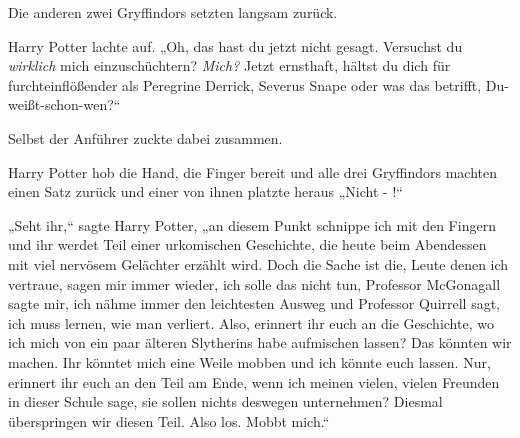 Die anderen zwei Gryffindors setzten langsam zurück.

Harry Potter lachte auf. „Oh, das hast du jetzt nicht gesagt. Versuchst du \emph{wirklich} mich einzuschüchtern? \emph{Mich?} Jetzt ernsthaft, hältst du dich für furchteinflößender als Peregrine Derrick, Severus Snape oder was das betrifft, Du-weißt-schon-wen?“

Selbst der Anführer zuckte dabei zusammen.

Harry Potter hob die Hand, die Finger bereit und alle drei Gryffindors machten einen Satz zurück und einer von ihnen platzte heraus „Nicht - !“

„Seht ihr,“ sagte Harry Potter, „an diesem Punkt schnippe ich mit den Fingern und ihr werdet Teil einer urkomischen Geschichte, die heute beim Abendessen mit viel nervösem Gelächter erzählt wird. Doch die Sache ist die, Leute denen ich vertraue, sagen mir immer wieder, ich solle das nicht tun, Professor McGonagall sagte mir, ich nähme immer den leichtesten Ausweg und Professor Quirrell sagt, ich muss lernen, wie man verliert. Also, erinnert ihr euch an die Geschichte, wo ich mich von ein paar älteren Slytherins habe aufmischen lassen? Das könnten wir machen. Ihr könntet mich eine Weile mobben und ich könnte euch lassen. Nur, erinnert ihr euch an den Teil am Ende, wenn ich meinen vielen, vielen Freunden in dieser Schule sage, sie sollen nichts deswegen unternehmen? Diesmal überspringen wir diesen Teil. Also los. Mobbt mich.“

